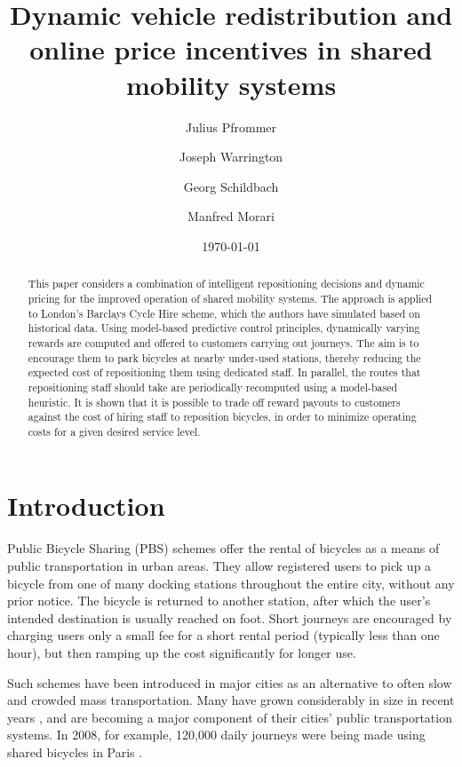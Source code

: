 \documentclass{article}
\begin{document}
\title{Dynamic vehicle redistribution and online price incentives in shared mobility systems}

\author{Julius Pfrommer \and Joseph Warrington \and Georg Schildbach \and Manfred Morari}

\date{\today}

\maketitle

\begin{abstract}
  This paper considers a combination of intelligent repositioning decisions and
  dynamic pricing for the improved operation of shared mobility systems. The
  approach is applied to London's Barclays Cycle Hire scheme, which the authors
  have simulated based on historical data. Using model-based predictive control
  principles, dynamically varying rewards are computed and offered to customers
  carrying out journeys. The aim is to encourage them to park bicycles at nearby
  under-used stations, thereby reducing the expected cost of repositioning them
  using dedicated staff. In parallel, the routes that repositioning staff should
  take are periodically recomputed using a model-based heuristic. It is shown
  that it is possible to trade off reward payouts to customers against the cost
  of hiring staff to reposition bicycles, in order to minimize operating costs
  for a given desired service level.
\end{abstract}

\section{Introduction}
\label{sec:intro}

Public Bicycle Sharing (PBS) schemes offer the rental of bicycles as a means of
public transportation in urban areas. They allow registered users to pick up a
bicycle from one of many docking stations throughout the entire city, without
any prior notice. The bicycle is returned to another station, after which the
user's intended destination is usually reached on foot. Short journeys are
encouraged by charging users only a small fee for a short rental period
(typically less than one hour), but then ramping up the cost significantly for
longer use.

Such schemes have been introduced in major cities as an alternative to often
slow and crowded mass transportation. Many have grown considerably in size in
recent years \cite{shaheen_bikesharing_2010, demaio_bike-sharing:_2009}, and are
becoming a major component of their cities' public transportation systems. In
2008, for example, 120{,}000 daily journeys were being made using shared
bicycles in Paris \cite{erlanger2008}.
\end{document}
